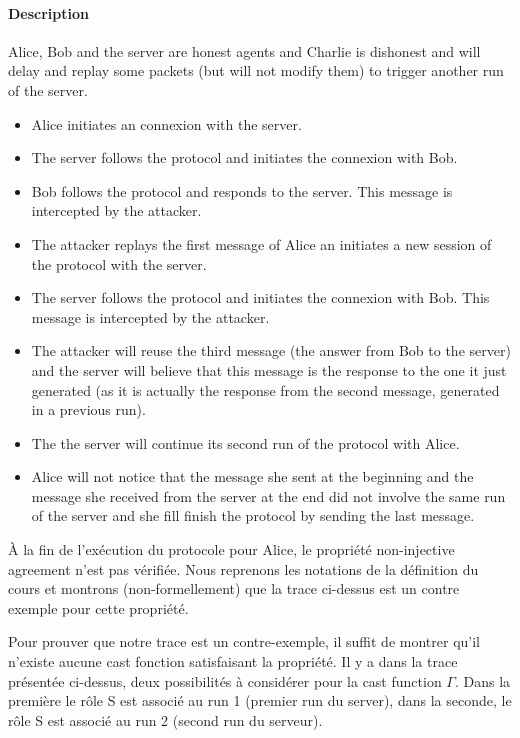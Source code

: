 \documentclass[10pt,a4paper]{article}
\begin{document}
\paragraph{Description}
Alice, Bob and the server are honest agents and Charlie is dishonest and will delay and replay some packets (but will not modify them) to trigger another run of the server.
\begin{itemize}
 \item Alice initiates an connexion with the server.
 \item The server follows the protocol and initiates the connexion with Bob.
 \item Bob follows the protocol and responds to the server. This message is intercepted by the attacker.
 \item The attacker replays the first message of Alice an initiates a new session of the protocol with the server.
 \item The server follows the protocol and initiates the connexion with Bob. This message is intercepted by the attacker.
 \item The attacker will reuse the third message (the answer from Bob to the server) and the server will believe that this message is the response to the one it just generated (as it is actually the response from the second message, generated in a previous run).
 \item The the server will continue its second run of the protocol with Alice.
 \item Alice will not notice that the message she sent at the beginning and the message she received from the server at the end did not involve the same run of the server and she fill finish the protocol by sending the last message.
\end{itemize}


À la fin de l'exécution du protocole pour Alice, le propriété non-injective agreement n'est pas vérifiée.
Nous reprenons les notations de la définition du cours et montrons (non-formellement) que la trace ci-dessus est un contre exemple pour cette propriété.

Pour prouver que notre trace est un contre-exemple, il suffit de montrer qu'il n'existe aucune cast fonction satisfaisant la propriété.
Il y a dans la trace présentée ci-dessus, deux possibilités à considérer pour la cast function $\Gamma$. Dans la première le rôle S est associé au run 1 (premier run du server), dans la seconde, le rôle S est associé au run 2 (second run du serveur).
\end{document}
